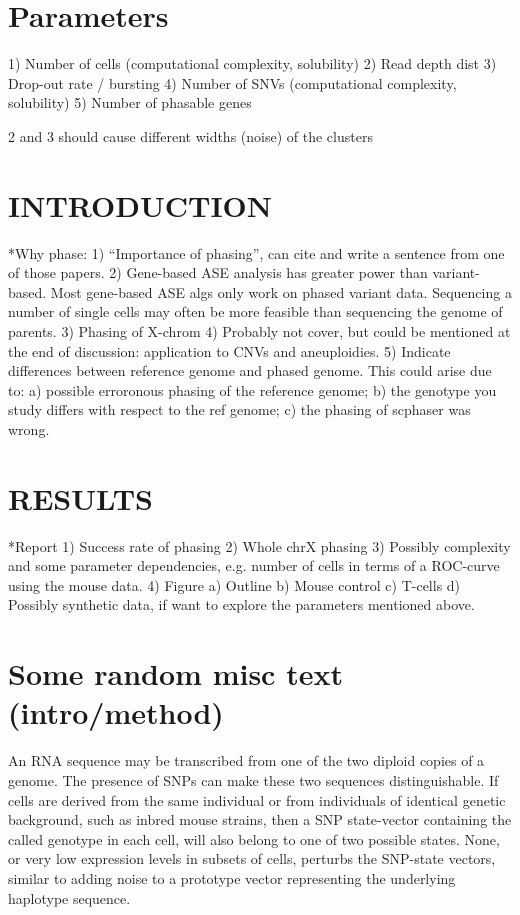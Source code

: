 \section{Parameters}
1) Number of cells (computational complexity, solubility)
2) Read depth dist
3) Drop-out rate / bursting
4) Number of SNVs (computational complexity, solubility)
5) Number of phasable genes

2 and 3 should cause different widths (noise) of the clusters


\section{INTRODUCTION}
*Why phase:
1) ``Importance of phasing'', can cite and write a sentence from one of those papers.
2) Gene-based ASE analysis has greater power than variant-based. Most gene-based ASE algs only work on phased variant data. Sequencing a number of single cells may often be more feasible than sequencing the genome of parents.
3) Phasing of X-chrom
4) Probably not cover, but could be mentioned at the end of
discussion: application to CNVs and aneuploidies.
5) Indicate differences between reference genome and phased
genome. This could arise due to: a) possible erroronous phasing of
the reference genome; b) the genotype you study differs with respect to
the ref genome; c) the phasing of scphaser was wrong.

\section{RESULTS}
*Report
1) Success rate of phasing
2) Whole chrX phasing
3) Possibly complexity and some parameter dependencies, e.g. number of
cells in terms of a ROC-curve using the mouse data.
4) Figure
a) Outline
b) Mouse control
c) T-cells
d) Possibly synthetic data, if want to explore the parameters mentioned above.


\section{Some random misc text (intro/method)}
An RNA sequence may be transcribed from one of the two diploid copies of a genome. The presence of SNPs can make these two sequences distinguishable. If cells are derived from the same individual or from individuals of identical genetic background, such as inbred mouse strains, then a SNP state-vector containing the called genotype in each cell, will also belong to one of two possible states. None, or very low expression levels in subsets of cells, perturbs the SNP-state vectors, similar to adding noise to a prototype vector representing the underlying haplotype sequence. 

